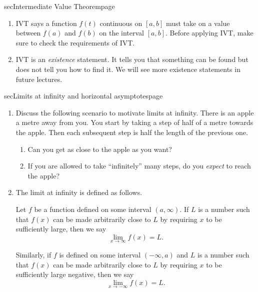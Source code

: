 \documentclass[../main]{subfiles}
\begin{document}
\begin{outline}{sec}{Intermediate Value Theorem}{page}
\begin{enumerate}
    \item {IVT says a function \(f(t)\) continuous on \([a,b]\) must take on a value between \(f(a)\) and \(f(b)\) on the interval \([a,b]\). Before applying IVT, make sure to check the requirements of IVT.}
    \item {IVT is an \emph{existence} statement. It tells you that something can be found but does not tell you how to find it.  We will see more existence statements in future lectures.}

  \end{enumerate}
\end{outline}


\begin{outline}{sec}{Limits at infinity and horizontal asymptotes}{page}
  \begin{enumerate}
    \item Discuss the following scenario to motivate limits at infinity. There is an apple a metre away from you.  You start by taking a step of half of a metre towards the apple.  Then each subsequent step is half the length of the previous one.
          \begin{enumerate}
            \item Can you get as close to the apple as you want?
            \item If you are allowed to take ``infinitely'' many steps, do you \emph{expect} to reach the apple?
          \end{enumerate}

    \item {The limit at infinity is defined as follows.}
          \begin{mdframed}[style=simple]
            Let \(f\) be a function defined on some interval \((a,\infty)\). If \(L\) is a number such that \(f(x)\) can be made arbitrarily close to \(L\) by requiring \(x\) to be sufficiently large, then we say
            \[
              \lim_{x \to \infty} f(x) = L.
            \]

            Similarly, if \(f\) is defined on some interval \((-\infty, a)\) and \(L\) is a number such that \(f(x)\) can be made arbitrarily close to \(L\) by requiring \(x\) to be sufficiently large negative, then we say
            \[
              \lim_{x \to -\infty} f(x) = L.
            \]
          \end{mdframed}



\end{enumerate}
\end{outline}
\end{document}
